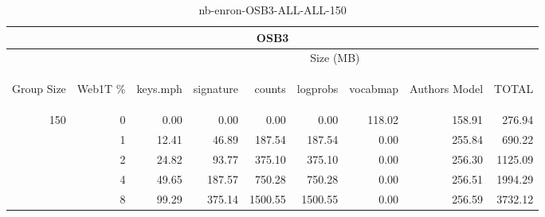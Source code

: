 \begin{center}
\begin{table}[htbp] 
 \begin{center}
\begin{tabular}{ | r | r | r | r | r | r | r | r | r |}
\hline
\multicolumn{9}{|c|}{OSB3}\\
\hline
 & & \multicolumn{7}{|c|}{Size (MB)}\\ \cline{3-9}
\begin{sideways}Group Size\end{sideways} & \begin{sideways}Web1T \% \end{sideways} & \begin{sideways}keys.mph\end{sideways} & \begin{sideways}signature\end{sideways} & \begin{sideways}counts\end{sideways} & \begin{sideways}logprobs\end{sideways} & \begin{sideways}vocabmap\end{sideways} & \begin{sideways}Authors Model \end{sideways} & \begin{sideways}TOTAL\end{sideways}\\
\hline
\multirow{4}{*}{150}
 & 0 & 0.00 & 0.00 & 0.00 & 0.00 & 118.02 & 158.91 & 276.94\\ \cline{2-9}
 & 1 & 12.41 & 46.89 & 187.54 & 187.54 & 0.00 & 255.84 & 690.22\\ \cline{2-9}
 & 2 & 24.82 & 93.77 & 375.10 & 375.10 & 0.00 & 256.30 & 1125.09\\ \cline{2-9}
 & 4 & 49.65 & 187.57 & 750.28 & 750.28 & 0.00 & 256.51 & 1994.29\\ \cline{2-9}
 & 8 & 99.29 & 375.14 & 1500.55 & 1500.55 & 0.00 & 256.59 & 3732.12\\ \cline{2-9}
\hline
\end{tabular}
\caption{nb-enron-OSB3-ALL-ALL-150}
\label{table:nb-enron-OSB3-ALL-ALL-150}
\end{center}
 \end{table}
\end{center}

